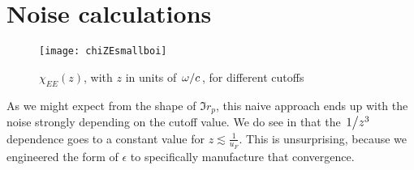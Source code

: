 \documentclass[11pt]{article}
\begin{document}
	\section{Noise calculations} \label{sec:noise}
	\begin{figure}[htp]
		\centering
		\texttt{[image: chiZEsmallboi]}
		\caption{$\chi_{EE}(z)$, with $z$ in units of $\flatfrac{\omega}{c}$, for different cutoffs} \label{fig:chiZRange}
	\end{figure}
	As we might expect from the shape of $\Im r_p$, this naive approach ends up with the noise strongly depending on the cutoff value.
	We do see in  that the $\flatfrac{1}{z^3}$ dependence goes to a constant value for $z \lesssim \frac{1}{u_F}$.
	This is unsurprising, because we engineered the form of $\epsilon$ to specifically manufacture that convergence.



	\newpage
	\listoftodos
	\newpage
	\printbibliography
\end{document}
